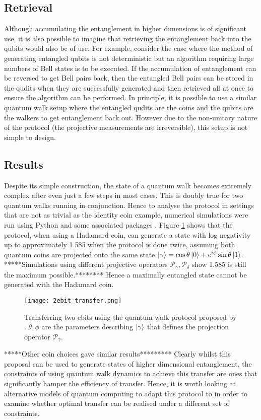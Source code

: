 \subsection{Retrieval}
\label{subsection:qw_retrieval}
Although accumulating the entanglement in higher dimensions is of significant use, it is also possible to imagine that retrieving the entanglement back into the qubits would also be of use.
For example, consider the case where the method of generating entangled qubits is not deterministic but an algorithm requiring large numbers of Bell states is to be executed.
If the accumulation of entanglement can be reversed to get Bell pairs back, then the entangled Bell pairs can be stored in the qudits when they are successfully generated and then retrieved all at once to ensure the algorithm can be performed.
In principle, it is possible to use a similar quantum walk setup where the entangled qudits are the coins and the qubits are the walkers to get entanglement back out.
However due to the non-unitary nature of the protocol (the projective measurements are irreversible), this setup is not simple to design.

\subsection{Results}
\label{subsection:results}
Despite its simple construction, the state of a quantum walk becomes extremely complex after even just a few steps in most cases.
This is doubly true for two quantum walks running in conjunction.
Hence to analyse the protocol in settings that are not as trivial as the identity coin example, numerical simulations were run using Python and some associated packages \cite{numpy, scipy}.
Figure \ref{fig:2ebittransfer} shows that the protocol, when using a Hadamard coin, can generate a state with log negativity up to approximately 1.585 when the protocol is done twice, assuming both quantum coins are projected onto the same state $\ket{\gamma} = \cos{\theta}\ket{0} + e^{i\phi}\sin{\theta}\ket{1}$.
*****Simulations using different projective operators $\mathcal{P}_\gamma, \mathcal{P}_\delta$ show 1.585 is still the maximum possible.********
Hence a maximally entangled state cannot be generated with the Hadamard coin.
\begin{figure}
    \centering
    \texttt{[image: 2ebit\_transfer.png]}
    \caption{Transferring two ebits using the quantum walk protocol proposed by \cite{giordani2020}. $\theta, \phi$ are the parameters describing $\ket{\gamma}$ that defines the projection operator $\mathcal{P}_\gamma$.}
    \label{fig:2ebittransfer}
\end{figure}
*****Other coin choices gave similar results*********
Clearly whilst this proposal can be used to generate states of higher dimensional entanglement, the constraints of using quantum walk dynamics to achieve this transfer are ones that significantly hamper the efficiency of transfer.
Hence, it is worth looking at alternative models of quantum computing to adapt this protocol to in order to examine whether optimal transfer can be realised under a different set of constraints.